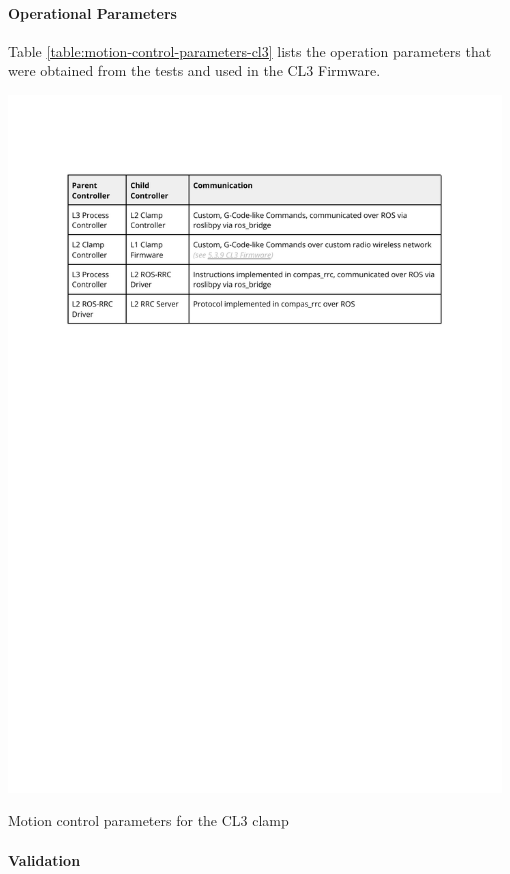 \FloatBarrier

\paragraph{Operational Parameters}

Table \ref{table:motion-control-parameters-cl3} lists the operation parameters that were obtained from the tests and used in the CL3 Firmware.

\begin{table}[h]
    \includegraphics[page=8, trim=25.4mm 135mm 25.4mm 33mm, clip, width=0.98\textwidth]{tables/Tables in Chapter 5.pdf}
    \caption{Motion control parameters for the CL3 clamp}
    \label{table:motion-control-parameters-cl3}
\end{table}

\FloatBarrier

\paragraph{Validation}

